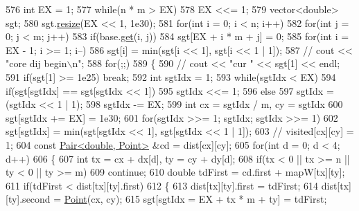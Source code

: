 \begin{DoxyCode}
576         \textcolor{keywordtype}{int} EX = 1;
577         \textcolor{keywordflow}{while}(n * m > EX)
578             EX <<= 1;
579         vector<double> sgt;
580         sgt.\hyperlink{classMatrix_a15ce96c8af4c7a982c2c10b96f29cea1}{resize}(EX << 1, 1e30);
581         \textcolor{keywordflow}{for}(\textcolor{keywordtype}{int} i = 0; i < n; i++)
582             \textcolor{keywordflow}{for}(\textcolor{keywordtype}{int} j = 0; j < m; j++)
583                 \textcolor{keywordflow}{if}(base.\hyperlink{classBitMatrix_ad19d1045b54ccc8a99d70d38305b4ca6}{get}(i, j))
584                     sgt[EX + i * m + j] = 0;
585         \textcolor{keywordflow}{for}(\textcolor{keywordtype}{int} i = EX - 1; i >= 1; i--)
586             sgt[i] = min(sgt[i << 1], sgt[i << 1 | 1]);
587         \textcolor{comment}{// cout << "core dij begin\(\backslash\)n";}
588         \textcolor{keywordflow}{for}(;;)
589         \{
590             \textcolor{comment}{// cout << "cur " << sgt[1] << endl;}
591             \textcolor{keywordflow}{if}(sgt[1] >= 1e25) \textcolor{keywordflow}{break};
592             \textcolor{keywordtype}{int} sgtIdx = 1;
593             \textcolor{keywordflow}{while}(sgtIdx < EX)
594                 \textcolor{keywordflow}{if}(sgt[sgtIdx] == sgt[sgtIdx << 1])
595                     sgtIdx <<= 1;
596                 \textcolor{keywordflow}{else}
597                     sgtIdx = (sgtIdx << 1 | 1);
598             sgtIdx -= EX;
599             \textcolor{keywordtype}{int} cx = sgtIdx / m, cy = sgtIdx %
600             sgt[sgtIdx += EX] = 1e30;
601             \textcolor{keywordflow}{for}(sgtIdx >>= 1; sgtIdx; sgtIdx >>= 1)
602                 sgt[sgtIdx] = min(sgt[sgtIdx << 1], sgt[sgtIdx << 1 | 1]);
603             \textcolor{comment}{// visited[cx][cy] = 1;}
604             \textcolor{keyword}{const} \hyperlink{classPair}{Pair<double, Point>} &cd = dist[cx][cy];
605             \textcolor{keywordflow}{for}(\textcolor{keywordtype}{int} d = 0; d < 4; d++)
606             \{
607                 \textcolor{keywordtype}{int} tx = cx + dx[d], ty = cy + dy[d];
608                 \textcolor{keywordflow}{if}(tx < 0 || tx >= n || ty < 0 || ty >= m)
609                     \textcolor{keywordflow}{continue};
610                 \textcolor{keywordtype}{double} tdFirst = cd.first + mapW[tx][ty];
611                 \textcolor{keywordflow}{if}(tdFirst < dist[tx][ty].first)
612                 \{
613                     dist[tx][ty].first = tdFirst;
614                     dist[tx][ty].second = \hyperlink{classPoint}{Point}(cx, cy);
615                     sgt[sgtIdx = EX + tx * m + ty] = tdFirst;

\end{DoxyCode}
